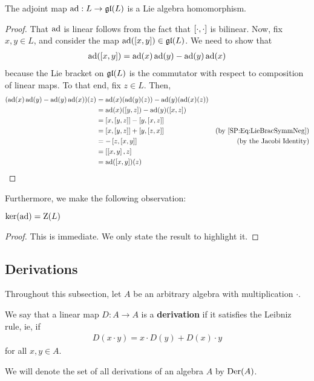 \begin{boxproposition}\label{Ch1:Prop:AdjointLieAlgHom}
    The adjoint map $\operatorname{ad} : L \to \mathfrak{gl}\!\left( L \right)$ is a Lie algebra homomorphism.
\end{boxproposition}
\begin{proof}
    That $\operatorname{ad}$ is linear follows from the fact that $\left[ \cdot, \cdot \right]$ is bilinear. Now, fix $x, y \in L$, and consider the map $\operatorname{ad}\!\left( \left[ x, y \right] \right) \in \mathfrak{gl}\!\left( L \right)$. We need to show that
    \begin{align*}
        \operatorname{ad}\!\left( \left[ x, y \right] \right) = \operatorname{ad}\!\left( x \right)\operatorname{ad}\!\left( y \right) - \operatorname{ad}\!\left( y \right)\operatorname{ad}\!\left( x \right)
    \end{align*}
    because the Lie bracket on $\mathfrak{gl}\!\left( L \right)$ is the commutator with respect to composition of linear maps. To that end, fix $z \in L$. Then,
    \begin{align*}
        \parenth{\pad{x}\pad{y} - \pad{y}\pad{x}}\!(z)
        &= \pad{x}\!\parenth{\pad{y}\!(z)} - \pad{y}\!\parenth{\pad{x}\!(z)} & \\
        &= \pad{x}\!\parenth{\brac{y, z}} - \pad{y}\!\parenth{\brac{x, z}} & \\
        &= \brac{x, \brac{y, z}} - \brac{y, \brac{x, z}} & \\
        &= \brac{x, \brac{y, z}} + \brac{y, \brac{z, x}} & \text{(by \eqref{SP:Eq:LieBracSymmNeg})} \\
        &= - \brac{z, \brac{x, y}} & \text{(by the Jacobi Identity)} \\
        &= \brac{\brac{x, y}, z} \\
        &= \pad{\brac{x, y}}\!(z)
    \end{align*}
\end{proof}

Furthermore, we make the following observation:
\begin{boxlemma}
    $\operatorname{ker}\!\left( \operatorname{ad} \right) = \operatorname{Z}\!\left( L \right)$
\end{boxlemma}
\begin{proof}
    This is immediate. We only state the result to highlight it.
\end{proof}

\subsection{Derivations}

Throughout this subsection, let $A$ be an arbitrary algebra with multiplication $\cdot$.

\begin{boxdefinition}
    We say that a linear map $D : A \to A$ is a \textbf{derivation} if it satisfies the Leibniz rule, ie, if
    \begin{align}
        D(x \cdot y) = x \cdot D(y) + D(x) \cdot y
        \label{Ch1:Eq:LeibnizRule}
    \end{align}
    for all $x, y \in A$.
\end{boxdefinition}
\begin{boxconvention}
    We will denote the set of all derivations of an algebra $A$ by $\operatorname{Der}\!\left( A \right)$.
\end{boxconvention}

